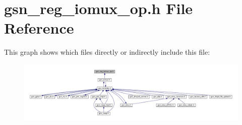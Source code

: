 \hypertarget{a00559}{
\section{gsn\_\-reg\_\-iomux\_\-op.h File Reference}
\label{a00559}
}
This graph shows which files directly or indirectly include this file:
\nopagebreak
\begin{figure}[H]
\begin{center}
\leavevmode
\includegraphics[width=400pt]{a00795}
\end{center}
\end{figure}
